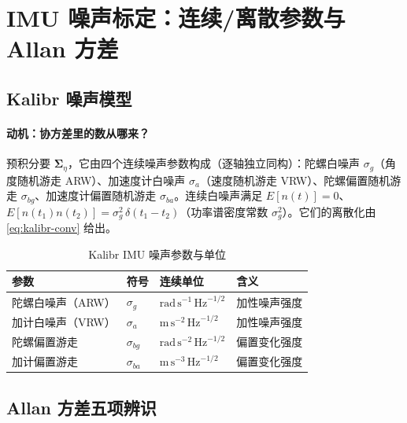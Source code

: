 \section{IMU 噪声标定：连续/离散参数与 Allan 方差}
\label{sec:imu-noise}

\subsection{Kalibr 噪声模型}
\label{subsec:kalibr}

\paragraph{动机：协方差里的数从哪来？}
预积分要 $\boldsymbol\Sigma_\eta$，它由四个连续噪声参数构成（逐轴独立同构）\cite{rehder2016kalibr}：陀螺白噪声 $\sigma_g$（角度随机游走 ARW）、加速度计白噪声 $\sigma_a$（速度随机游走 VRW）、陀螺偏置随机游走 $\sigma_{bg}$、加速度计偏置随机游走 $\sigma_{ba}$。连续白噪声满足 $E[n(t)]=0$、$E[n(t_1)n(t_2)]=\sigma_g^2\,\delta(t_1-t_2)$（功率谱密度常数 $\sigma_g^2$）。它们的离散化由 \cref{eq:kalibr-conv} 给出。

\begin{table}[H]\centering\small
\caption{Kalibr IMU 噪声参数与单位\cite{rehder2016kalibr}}
\label{tab:kalibr-params}
\begin{tabular}{llll}
\toprule
参数 & 符号 & 连续单位 & 含义 \\
\midrule
陀螺白噪声（ARW） & $\sigma_g$ & $\mathrm{rad}\,\mathrm s^{-1}\,\mathrm{Hz}^{-1/2}$ & 加性噪声强度 \\
加计白噪声（VRW） & $\sigma_a$ & $\mathrm{m}\,\mathrm s^{-2}\,\mathrm{Hz}^{-1/2}$ & 加性噪声强度 \\
陀螺偏置游走 & $\sigma_{bg}$ & $\mathrm{rad}\,\mathrm s^{-2}\,\mathrm{Hz}^{-1/2}$ & 偏置变化强度 \\
加计偏置游走 & $\sigma_{ba}$ & $\mathrm{m}\,\mathrm s^{-3}\,\mathrm{Hz}^{-1/2}$ & 偏置变化强度 \\
\bottomrule
\end{tabular}
\end{table}

\subsection{Allan 方差五项辨识}
\label{subsec:allan}

